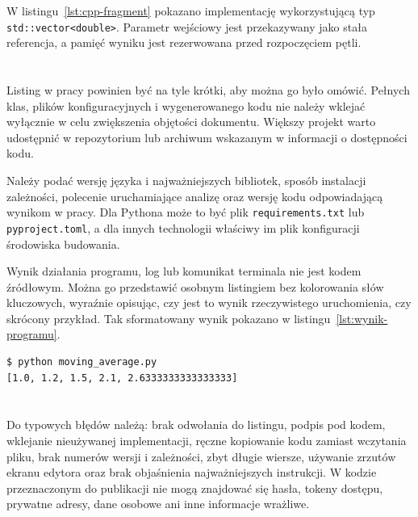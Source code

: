 W listingu~\ref{lst:cpp-fragment} pokazano implementację wykorzystującą typ
\texttt{std::vector<double>}. Parametr wejściowy jest przekazywany jako stała referencja,
a pamięć wyniku jest rezerwowana przed rozpoczęciem pętli.



\section{}

Listing w pracy powinien być na tyle krótki, aby można go było omówić. Pełnych klas,
plików konfiguracyjnych i wygenerowanego kodu nie należy wklejać wyłącznie w celu
zwiększenia objętości dokumentu. Większy projekt warto udostępnić w repozytorium lub
archiwum wskazanym w informacji o dostępności kodu.

Należy podać wersję języka i najważniejszych bibliotek, sposób instalacji zależności,
polecenie uruchamiające analizę oraz wersję kodu odpowiadającą wynikom w pracy. Dla
Pythona może to być plik \texttt{requirements.txt} lub \texttt{pyproject.toml}, a dla
innych technologii właściwy im plik konfiguracji środowiska budowania.

Wynik działania programu, log lub komunikat terminala nie jest kodem źródłowym. Można
go przedstawić osobnym listingiem bez kolorowania słów kluczowych, wyraźnie opisując,
czy jest to wynik rzeczywistego uruchomienia, czy skrócony przykład. Tak sformatowany
wynik pokazano w listingu~\ref{lst:wynik-programu}.

\begin{lstlisting}[style=thesis,caption={Przykładowy wynik uruchomienia programu},label={lst:wynik-programu},numbers=none,xleftmargin=0.25cm,framexleftmargin=0cm]
$ python moving_average.py
[1.0, 1.2, 1.5, 2.1, 2.6333333333333333]
\end{lstlisting}

\section{}

Do typowych błędów należą: brak odwołania do listingu, podpis pod kodem, wklejanie
nieużywanej implementacji, ręczne kopiowanie kodu zamiast wczytania pliku, brak numerów
wersji i zależności, zbyt długie wiersze, używanie zrzutów ekranu edytora oraz brak
objaśnienia najważniejszych instrukcji. W kodzie przeznaczonym do publikacji nie mogą
znajdować się hasła, tokeny dostępu, prywatne adresy, dane osobowe ani inne informacje
wrażliwe.
